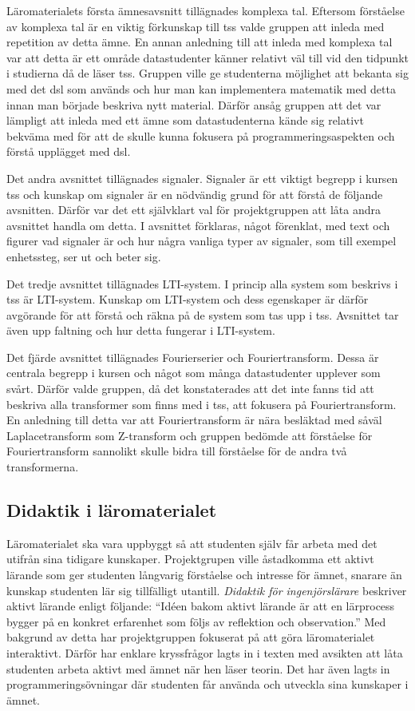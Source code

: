 \documentclass[12pt,a4paper,twoside,openright]{article}
\begin{document}
Läromaterialets första ämnesavsnitt tillägnades komplexa tal. Eftersom
förståelse av komplexa tal är en viktig förkunskap till \gls{tss}
valde gruppen att inleda med repetition av detta ämne. En annan
anledning till att inleda med komplexa tal var att detta är ett område
datastudenter känner relativt väl till vid den tidpunkt i studierna då
de läser \gls{tss}. Gruppen ville ge studenterna möjlighet att bekanta
sig med det \gls{dsl} som används och hur man kan implementera
matematik med detta innan man började beskriva nytt material. Därför
ansåg gruppen att det var lämpligt att inleda med ett ämne som
datastudenterna kände sig relativt bekväma med för att de skulle kunna
fokusera på programmeringsaspekten och förstå upplägget med \gls{dsl}.

Det andra avsnittet tillägnades signaler. Signaler är ett viktigt
begrepp i kursen \gls{tss} och kunskap om signaler är en nödvändig
grund för att förstå de följande avsnitten. Därför var det ett
självklart val för projektgruppen att låta andra avsnittet handla om
detta. I avsnittet förklaras, något förenklat, med text och figurer
vad signaler är och hur några vanliga typer av signaler, som till
exempel enhetssteg, ser ut och beter sig.

Det tredje avsnittet tillägnades LTI-system. I princip alla system som
beskrivs i \gls{tss} är LTI-system. Kunskap om LTI-system och dess
egenskaper är därför avgörande för att förstå och räkna på de system
som tas upp i \gls{tss}. Avsnittet tar även upp faltning och hur detta
fungerar i LTI-system.

Det fjärde avsnittet tillägnades Fourierserier och
Fouriertransform. Dessa är centrala begrepp i kursen och något som
många datastudenter upplever som svårt. Därför valde gruppen, då det
konstaterades att det inte fanns tid att beskriva alla transformer som
finns med i \gls{tss}, att fokusera på Fouriertransform. En anledning
till detta var att Fouriertransform är nära besläktad med såväl
Laplacetransform som Z-transform och gruppen bedömde att förståelse
för Fouriertransform sannolikt skulle bidra till förståelse för de
andra två transformerna.

\subsection{Didaktik i läromaterialet}
\label{sec:matDidaktik}
Läromaterialet ska vara uppbyggt så att studenten själv får arbeta med
det utifrån sina tidigare kunskaper. Projektgrupen ville åstadkomma ett aktivt
lärande som ger studenten långvarig förståelse och intresse för ämnet,
snarare än kunskap studenten lär sig tillfälligt
utantill. \textit{Didaktik för ingenjörslärare}
\cite[s~236]{didaktik_for_ingenjorslarare} beskriver aktivt lärande enligt
följande: ``Idéen bakom aktivt lärande är att en lärprocess bygger på
en konkret erfarenhet som följs av reflektion och observation.'' Med
bakgrund av detta har projektgruppen fokuserat på att göra
läromaterialet interaktivt. Därför har enklare kryssfrågor lagts in i
texten med avsikten att låta studenten arbeta aktivt med ämnet när hen läser
teorin. Det har även lagts in programmeringsövningar där studenten
får använda och utveckla sina kunskaper i ämnet.
\end{document}
